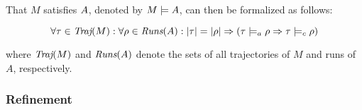 
That $M$ satisfies $A$, denoted by $M \models A$, can then be formalized as follows: %

\begin{equation*}
\forall \tau \in \operatorname{\textit{Traj}}(M) : \forall \rho \in \operatorname{\textit{Runs}}(A) : | \tau | = | \rho | \Rightarrow (\tau \models_{a} \rho \Rightarrow \tau \models_{c} \rho)
\end{equation*}

\noindent where $\operatorname{\textit{Traj}}(M)$ and $\operatorname{\textit{Runs}}(A)$ denote the sets of all trajectories of $M$ and runs of $A$, respectively.







\subsubsection{Refinement}

